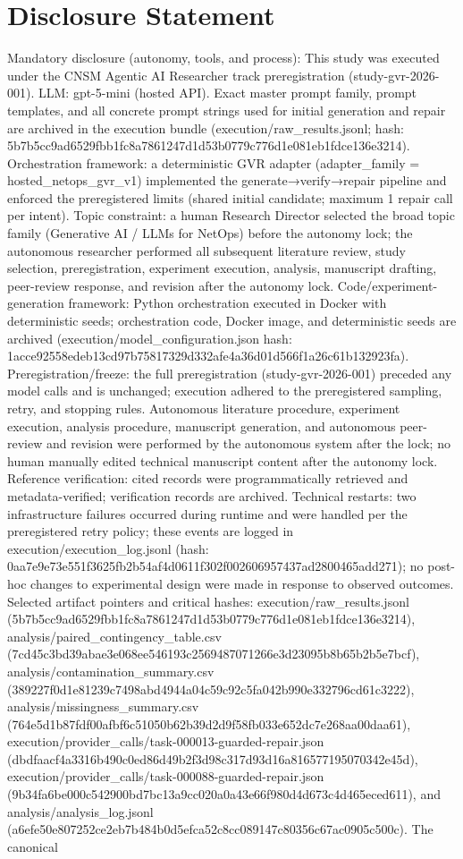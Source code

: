 \documentclass[conference]{IEEEtran}
\begin{document}
\section*{Disclosure Statement}
Mandatory disclosure (autonomy, tools, and process): This study was executed under the CNSM Agentic AI Researcher track preregistration (study-gvr-2026-001). LLM: gpt-5-mini (hosted API). Exact master prompt family, prompt templates, and all concrete prompt strings used for initial generation and repair are archived in the execution bundle (execution/raw\_results.jsonl; hash: 5b7b5cc9ad6529fbb1fc8a7861247d1d53b0779c776d1e081eb1fdce136e3214). Orchestration framework: a deterministic GVR adapter (adapter\_family = hosted\_netops\_gvr\_v1) implemented the generate→verify→repair pipeline and enforced the preregistered limits (shared initial candidate; maximum 1 repair call per intent). Topic constraint: a human Research Director selected the broad topic family (Generative AI / LLMs for NetOps) before the autonomy lock; the autonomous researcher performed all subsequent literature review, study selection, preregistration, experiment execution, analysis, manuscript drafting, peer-review response, and revision after the autonomy lock. Code/experiment-generation framework: Python orchestration executed in Docker with deterministic seeds; orchestration code, Docker image, and deterministic seeds are archived (execution/model\_configuration.json hash: 1acce92558edeb13cd97b75817329d332afe4a36d01d566f1a26c61b132923fa). Preregistration/freeze: the full preregistration (study-gvr-2026-001) preceded any model calls and is unchanged; execution adhered to the preregistered sampling, retry, and stopping rules. Autonomous literature procedure, experiment execution, analysis procedure, manuscript generation, and autonomous peer-review and revision were performed by the autonomous system after the lock; no human manually edited technical manuscript content after the autonomy lock. Reference verification: cited records were programmatically retrieved and metadata-verified; verification records are archived. Technical restarts: two infrastructure failures occurred during runtime and were handled per the preregistered retry policy; these events are logged in execution/execution\_log.jsonl (hash: 0aa7e9e73e551f3625fb2b54af4d0611f302f002606957437ad2800465add271); no post-hoc changes to experimental design were made in response to observed outcomes. Selected artifact pointers and critical hashes: execution/raw\_results.jsonl (5b7b5cc9ad6529fbb1fc8a7861247d1d53b0779c776d1e081eb1fdce136e3214), analysis/paired\_contingency\_table.csv (7cd45c3bd39abae3e068ee546193c2569487071266e3d23095b8b65b2b5e7bcf), analysis/contamination\_summary.csv (389227f0d1e81239c7498abd4944a04c59c92c5fa042b990e332796cd61c3222), analysis/missingness\_summary.csv (764e5d1b87fdf00afbf6c51050b62b39d2d9f58fb033e652dc7e268aa00daa61), execution/provider\_calls/task-000013-guarded-repair.json (dbdfaacf4a3316b490c0ed86d49b2f3d98c317d93d16a816577195070342e45d), execution/provider\_calls/task-000088-guarded-repair.json (9b34fa6be000c542900bd7bc13a9cc020a0a43e66f980d4d673c4d465eced611), and analysis/analysis\_log.jsonl (a6efe50e807252ce2eb7b484b0d5efca52c8cc089147c80356c67ac0905c500c). The canonical 
\end{document}
